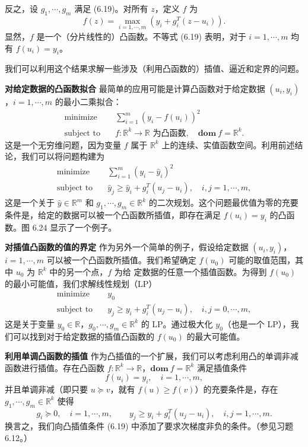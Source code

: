 \documentclass[UTF8,12pt,a4paper,fontset=fandol]{ctexart}
\begin{document}
反之，设 $g_1,\cdots,g_m$ 满足 (6.19)。对所有 $z$，定义 $f$ 为
\[
f(z)=\max_{i=1,\cdots,m}\left(y_i+g_i^T(z-u_i)\right).
\]
显然，$f$ 是一个（分片线性的）凸函数。不等式 (6.19) 表明，对于 $i=1,\cdots,m$ 均有 $f(u_i)=y_i$。

我们可以利用这个结果求解一些涉及（利用凸函数的）插值、逼近和定界的问题。

\noindent\textbf{对给定数据的凸函数拟合}\quad
最简单的应用可能是计算凸函数对于给定数据 $(u_i,y_i)$，$i=1,\cdots,m$ 的最小二乘拟合：
\[
\begin{aligned}
\text{minimize}\quad & \sum_{i=1}^m(y_i-f(u_i))^2\\
\text{subject to}\quad & f:\mathbb{R}^k\to\mathbb{R}\text{ 为凸函数},\quad \mathbf{dom}\ f=\mathbb{R}^k.
\end{aligned}
\]
这是一个无穷维问题，因为变量 $f$ 属于 $\mathbb{R}^k$ 上的连续、实值函数空间。利用前述结论，我们可以将问题构建为
\[
\begin{aligned}
\text{minimize}\quad & \sum_{i=1}^m(y_i-\hat{y}_i)^2\\
\text{subject to}\quad & \hat{y}_j\geq \hat{y}_i+g_i^T(u_j-u_i),\quad i,j=1,\cdots,m,
\end{aligned}
\]
这是一个关于 $\hat{y}\in\mathbb{R}^m$ 和 $g_1,\cdots,g_m\in\mathbb{R}^k$ 的二次规划。这个问题最优值为零的充要条件是，给定的数据可以被一个凸函数所插值，即存在满足 $f(u_i)=y_i$ 的凸函数。图 6.24 显示了一个例子。

\noindent\textbf{对插值凸函数的值的界定}\quad
作为另外一个简单的例子，假设给定数据 $(u_i,y_i)$，$i=1,\cdots,m$ 可以被一个凸函数所插值。我们希望确定 $f(u_0)$ 可能的取值范围，其中 $u_0$ 为 $\mathbb{R}^k$ 中的另一个点，$f$ 为给
定数据的任意一个插值函数。为得到 $f(u_0)$ 的最小可能值，我们求解线性规划（LP）
\[
\begin{aligned}
\text{minimize}\quad & y_0\\
\text{subject to}\quad & y_j\geq y_i+g_i^T(u_j-u_i),\quad i,j=0,\cdots,m,
\end{aligned}
\]
这是关于变量 $y_0\in\mathbb{R}$，$g_0,\cdots,g_m\in\mathbb{R}^k$ 的 LP。通过极大化 $y_0$（也是一个 LP），我们可以找到对于给定数据的插值凸函数的 $f(u_0)$ 的最大可能值。

\noindent\textbf{利用单调凸函数的插值}\quad
作为凸插值的一个扩展，我们可以考虑利用凸的单调非减函数进行插值。存在凸函数 $f:\mathbb{R}^k\to\mathbb{R}$，$\mathbf{dom}\ f=\mathbb{R}^k$ 满足插值条件
\[
f(u_i)=y_i,\quad i=1,\cdots,m,
\]
并且单调非减（即只要 $u\succeq v$，就有 $f(u)\geq f(v)$）的充要条件是，存在 $g_1,\cdots,g_m\in\mathbb{R}^k$ 使得
\begin{equation}
g_i\succeq 0,\quad i=1,\cdots,m,\qquad y_j\geq y_i+g_i^T(u_j-u_i),\quad i,j=1,\cdots,m.
\tag{6.21}
\end{equation}
换言之，我们向凸插值条件 (6.19) 中添加了要求次梯度非负的条件。（参见习题 6.12。）
\end{document}
